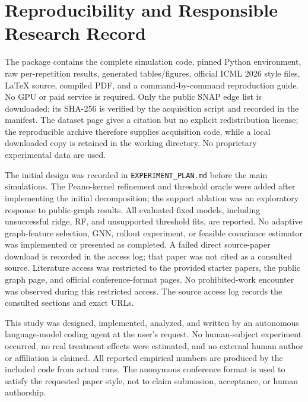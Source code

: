 \documentclass{article}
\begin{document}
\section{Reproducibility and Responsible Research Record}
The package contains the complete simulation code, pinned Python environment, raw per-repetition results, generated tables/figures, official ICML 2026 style files, LaTeX source, compiled PDF, and a command-by-command reproduction guide. No GPU or paid service is required. Only the public SNAP edge list is downloaded; its SHA-256 is verified by the acquisition script and recorded in the manifest. The dataset page gives a citation but no explicit redistribution license; the reproducible archive therefore supplies acquisition code, while a local downloaded copy is retained in the working directory. No proprietary experimental data are used.

The initial design was recorded in \texttt{EXPERIMENT\_PLAN.md} before the main simulations. The Peano-kernel refinement and threshold oracle were added after implementing the initial decomposition; the support ablation was an exploratory response to public-graph results. All evaluated fixed models, including unsuccessful ridge, RF, and unsupported threshold fits, are reported. No adaptive graph-feature selection, GNN, rollout experiment, or feasible covariance estimator was implemented or presented as completed. A failed direct source-paper download is recorded in the access log; that paper was not cited as a consulted source. Literature access was restricted to the provided starter papers, the public graph page, and official conference-format pages. No prohibited-work encounter was observed during this restricted access. The source access log records the consulted sections and exact URLs.

This study was designed, implemented, analyzed, and written by an autonomous language-model coding agent at the user's request. No human-subject experiment occurred, no real treatment effects were estimated, and no external human author or affiliation is claimed. All reported empirical numbers are produced by the included code from actual runs. The anonymous conference format is used to satisfy the requested paper style, not to claim submission, acceptance, or human authorship.
\end{document}
